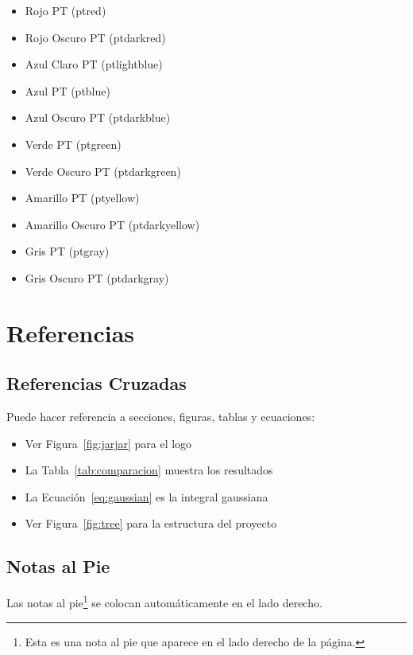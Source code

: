 \documentclass{pt-article}
\begin{document}
\begin{itemize}
    \item \textcolor{ptred}{Rojo PT (ptred)}
    \item \textcolor{ptdarkred}{Rojo Oscuro PT (ptdarkred)}
    \item \textcolor{ptlightblue}{Azul Claro PT (ptlightblue)}
    \item \textcolor{ptblue}{Azul PT (ptblue)}
    \item \textcolor{ptdarkblue}{Azul Oscuro PT (ptdarkblue)}
    \item \textcolor{ptgreen}{Verde PT (ptgreen)}
    \item \textcolor{ptdarkgreen}{Verde Oscuro PT (ptdarkgreen)}
    \item \textcolor{ptyellow}{Amarillo PT (ptyellow)}
    \item \textcolor{ptdarkyellow}{Amarillo Oscuro PT (ptdarkyellow)}
    \item \textcolor{ptgray}{Gris PT (ptgray)}
    \item \textcolor{ptdarkgray}{Gris Oscuro PT (ptdarkgray)}
\end{itemize}

\section{Referencias}

\subsection{Referencias Cruzadas}

Puede hacer referencia a secciones, figuras, tablas y ecuaciones:

\begin{itemize}
    \item Ver Figura~\ref{fig:jarjar} para el logo
    \item La Tabla~\ref{tab:comparacion} muestra los resultados
    \item La Ecuación~\ref{eq:gaussian} es la integral gaussiana
    \item Ver Figura~\ref{fig:tree} para la estructura del proyecto
\end{itemize}

\subsection{Notas al Pie}

Las notas al pie\footnote{Esta es una nota al pie que aparece en el lado
derecho de la página.} se colocan automáticamente en el lado derecho.
\end{document}
